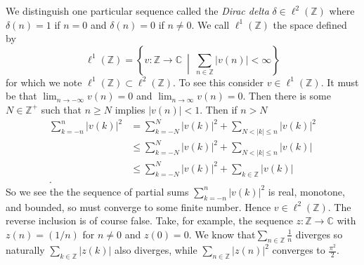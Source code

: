 \documentclass{report}
\newcommand{\Z}{\mathbb{Z}}
\newcommand{\C}{\mathbb{C}}
\begin{document}
 We distinguish one particular sequence called the \emph{Dirac delta} $\delta \in \ell^2 (\Z)$ where $\delta(n)=1$ if $n=0$ and $\delta(n)=0$ if $n \neq 0$.
We call $\ell^1 (\Z)$ the space defined by
$$
\ell^1(\Z)=\left \{ v: \Z \to \C \ \middle | \ \sum_{n\in \Z} |v(n)| < \infty \right \}
$$
for which we note $\ell^1 (\Z) \subset \ell^2 (\Z)$. To see this consider $v \in \ell^1 (\Z)$. It must be that $\lim_{n\to -\infty} v(n)=0$ and $\lim_{n\to \infty} v(n)=0$. Then there is some $N \in \Z^+$ such that $n \geq N$ implies $|v(n)|<1$. Then if $n>N$
\begin{align*}
\sum_{k=-n}^{n}|v(k)|^2 &=\sum_{k=-N}^{N}|v(k)|^2+\sum_{N<|k|\leq n}|v(k)|^2 \\
&\leq \sum_{k=-N}^{N}|v(k)|^2+\sum_{N<|k|\leq n}|v(k)|\\
&\leq \sum_{k=-N}^{N}|v(k)|^2+\sum_{k \in \Z}|v(k)|\\.
\end{align*}
So we see the the sequence of partial sums $\sum_{k=-n}^{n}|v(k)|^2$ is real, monotone, and bounded, so must converge to some finite number. Hence $v \in \ell^2 (\Z)$. The reverse inclusion is of course false. Take, for example, the sequence $z: \Z \to \C$ with $z(n)=(1/n)$ for $n\neq 0$ and $z(0)=0$. We know that$\sum_{n \in \Z} \frac{1}{n}$ diverges so naturally $\sum_{k\in \Z} |z(k)|$ also diverges, while $\sum_{n \in \Z} |z(n)|^2$ converges to $\frac{\pi^2}{2}$.
\end{document}
